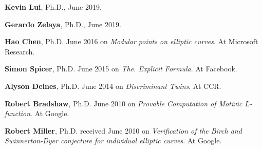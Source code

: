 \documentclass[10pt]{article}
\newenvironment{bulletlist}
   {
      \begin{list}
         {$\cdot$}
         {
            \setlength{\itemsep}{.5ex}
            \setlength{\parsep}{0ex}
            \setlength{\leftmargin}{2.2em}
            \setlength{\parskip}{0ex}
            \setlength{\topsep}{0ex}
         }
   }
   {
      \end{list}
   }
\newcounter{totalnumstudents}
\newenvironment{students}
   {
   \begin{revnumerate}[\value{totalnumstudents}]
   {}
         {
            \setlength{\itemsep}{.5ex}
            \setlength{\parsep}{0ex}
            \setlength{\leftmargin}{0em}
            \setlength{\parskip}{0ex}
            \setlength{\topsep}{0ex}
         }
   }
   {
\end{revnumerate}
   }
\newcommand{\marginlabel}[1]{
\begin{minipage}[b]{0.8\labelwidth}{\large \textsf{\textbf{#1}}}\end{minipage}}
\newcommand{\entrylabel}[1]{\mbox{\marginlabel{#1}}\hfill}
\newcommand{\MainListlabel}[1]
   {
      \parbox[t]{\labelwidth}{\hspace{.8em}\marginlabel{#1}}
   }
\newenvironment{MainList}[1]
   {
      \renewcommand{\entrylabel}{\MainListlabel}
      \begin{list}{}
      {
         \renewcommand{\makelabel}{\entrylabel}
         \setlength   {\itemindent}{-.65em}
         \setlength   {\labelwidth}{#1}
         \setlength   {\leftmargin}{\labelwidth}
         \setlength   {\itemsep}{3ex}
      }
   }
   {
      \end{list}
   }
\begin{document}
\begin{MainList}{88pt}

\item [Ph.D.\\Students]

\begin{students}
\item {\bf Kevin Lui}, Ph.D., June 2019.
\item {\bf Gerardo Zelaya}, Ph.D., June 2019.
\item {\bf Hao Chen}, Ph.D. June 2016 on {\em Modular points on elliptic curves}. At Microsoft Research.
\item {\bf Simon Spicer}, Ph.D. June 2015 on {\em The.
Explicit Formula}. At Facebook.
\item {\bf Alyson Deines}, Ph.D. June 2014 on {\em Discriminant Twins}.  At CCR.
\item {\bf Robert Bradshaw}, Ph.D. June 2010 on {\em Provable
    Computation of Motivic $L$-function}.  At Google.
\item {\bf Robert Miller}, Ph.D. received June 2010 on {\em
    Verification of the Birch and Swinnerton-Dyer conjecture for
    individual elliptic curves}.  At Google.
\end{students}




\end{MainList}
\end{document}
